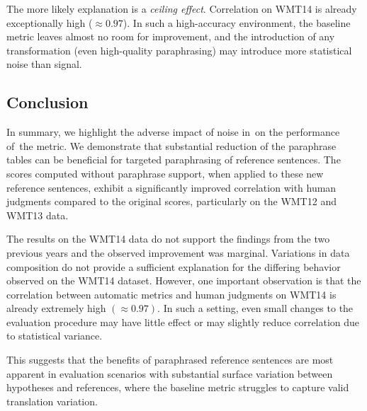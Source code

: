 \begin{table}[tb]
\caption{Pearson's correlation of \mn and the silver standard on sentences originally Czech or English only. Human judgments are computed only on those sentences as well.}
\label{limited}
\end{table} 

The more likely explanation is a \emph{ceiling effect}. Correlation on WMT14 is already exceptionally high ($\approx 0.97$). In such a high-accuracy environment, the baseline metric leaves almost no room for improvement, and the introduction of any transformation (even high-quality paraphrasing) may introduce more statistical noise than signal.

\subsection{Conclusion}
In summary, we highlight the adverse impact of noise in~\cmpt on the performance of~the \mn metric. We demonstrate that substantial reduction of the paraphrase tables can be beneficial for targeted paraphrasing of reference sentences. The \mn scores computed without paraphrase support, when applied to these new reference sentences, exhibit a significantly improved correlation with human judgments compared to the original \mn scores, particularly on the WMT12 and WMT13 data. 

The results on the WMT14 data do not support the findings from the two previous years and the observed improvement  was marginal. Variations in data composition do not provide a sufficient explanation for the differing behavior observed on the WMT14 dataset. However, one important observation is that the correlation between automatic metrics and human judgments on WMT14 is already extremely high $(\approx 0.97)$. In such a setting, even small changes to the evaluation procedure may have little effect or may slightly reduce correlation due to statistical variance.

This suggests that the benefits of paraphrased reference sentences are most apparent in evaluation scenarios with substantial surface variation between hypotheses and references, where the baseline metric struggles to capture valid translation variation.



